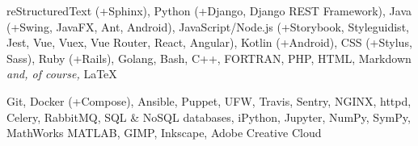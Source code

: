 
\sectiondescription
{
reStructuredText (+Sphinx),
Python (+Django, Django REST Framework),
Java (+Swing, JavaFX, Ant, Android),
JavaScript/Node.js (+Storybook, Styleguidist, Jest, Vue, Vuex, Vue Router, React, Angular),
Kotlin (+Android),
CSS (+Stylus, Sass),
Ruby (+Rails), Golang,
Bash, C++, FORTRAN,
PHP, HTML, Markdown
\textit{and, of course,} {\selectfont\LaTeX}
}

\sectiondescription
{
Git,
Docker (+Compose),
Ansible, Puppet, UFW,
Travis, Sentry,
NGINX, httpd, Celery, RabbitMQ, SQL \& NoSQL databases,
iPython, Jupyter, NumPy, SymPy, MathWorks MATLAB,
GIMP, Inkscape, Adobe Creative Cloud
}
